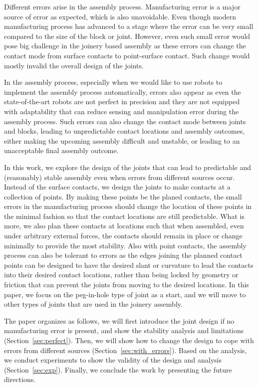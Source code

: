 \documentclass[11pt, twocolumn]{article}
\begin{document}
Different errors arise in the assembly process. Manufacturing error is a major source of error as expected, which is also unavoidable. Even though modern manufacturing process has advanced to a stage where the error can be very small compared to the size of the block or joint. However, even such small error would pose big challenge in the joinery based assembly as these errors can change the contact mode from surface contacts to point-surface contact. Such change would mostly invalid the overall design of the joints. 

In the assembly process, especially when we would like to use robots to implement the assembly process automatically, errors also appear as even the state-of-the-art robots are not perfect in precision and they are not equipped with adaptability that can reduce sensing and manipulation error during the assembly process. Such errors can also change the contact mode between joints and blocks, leading to unpredictable contact locations and assembly outcomes, either making the upcoming assembly difficult and unstable, or leading to an unacceptable final assembly outcome. 

In this work, we explore the design of the joints that can lead to predictable and (reasonably) stable assembly even when errors from different sources occur. Instead of the surface contacts, we design the joints to make contacts at a collection of points. By making these points be the planed contacts, the small errors in the manufacturing process should change the location of these points in the minimal fashion so that the contact locations are still predictable. What is more, we also plan these contacts at locations such that when assembled, even under arbitrary external forces, the contacts should remain in place or change minimally to provide the most stability. Also with point contacts, the assembly process can also be tolerant to errors as the edges joining the planned contact points can be designed to have the desired slant or curvature to lead the contacts into their desired contact locations, rather than being locked by geometry or friction that can prevent the joints from moving to the desired locations. In this paper, we focus on the peg-in-hole type of joint as a start, and we will move to other types of joints that are used in the joinery assembly. 

The paper organizes as follows, we will first introduce the joint design if no manufacturing error is present, and show the stability analysis and limitations (Section~\ref{sec:perfect}). Then, we will show how to change the design to cope with errors from different sources (Section~\ref{sec:with_errors}). Based on the analysis, we conduct experiments to show the validity of the design and analysis (Section~\ref{sec:exp}). Finally, we conclude the work by presenting the future directions. 
\end{document}
